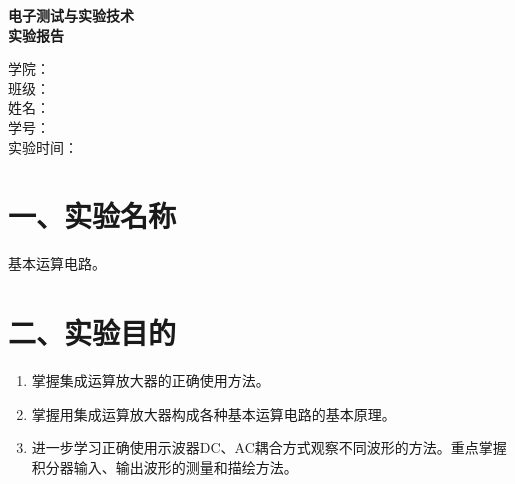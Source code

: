\documentclass[a4paper,12pt]{article}
\begin{document}
\begin{titlepage}
    \centering
    \vfill
    {\bfseries 电子测试与实验技术\\[0.6em]实验报告\par}
    \vfill
    \vfill

    \begin{minipage}{0.72\textwidth}
        学\quad\quad 院：\underline{}\\[1.6em]
        班\quad\quad 级：\underline{}\\[1.6em]
        姓\quad\quad 名：\underline{}\\[1.6em]
        学\quad\quad 号：\underline{}\\[1.6em]
        实验时间：\underline{}
    \end{minipage}

    \vfill
    \vfill
\end{titlepage}

\setcounter{page}{1}



\section*{一、实验名称}
基本运算电路。

\section*{二、实验目的}
\begin{enumerate}
    \item 掌握集成运算放大器的正确使用方法。
    \item 掌握用集成运算放大器构成各种基本运算电路的基本原理。
    \item 进一步学习正确使用示波器DC、AC耦合方式观察不同波形的方法。重点掌握积分器输入、输出波形的测量和描绘方法。
    
\end{enumerate}
\end{document}

